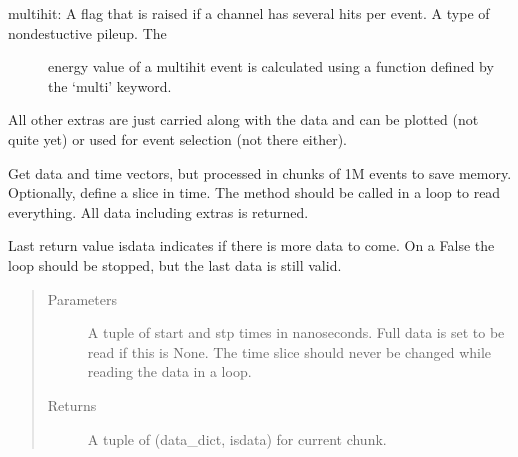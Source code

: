 \documentclass[letterpaper,10pt,english]{sphinxmanual}
\begin{document}
\begin{fulllineitems}
\begin{description}
\item[{multihit: A flag that is raised if a channel has several hits per event. A type of nondestuctive pileup. The}] \leavevmode
\sphinxAtStartPar
energy value of a multihit event is calculated using a function defined by the ‘multi’ keyword.

\end{description}

\sphinxAtStartPar
All other extras are just carried along with the data and can be plotted (not quite yet) or used for event
selection (not there either).

\begin{fulllineitems}
\label{\detokenize{autodocs/data:listmode.data.Data.get_data_block}}
\sphinxAtStartPar
Get data and time vectors, but processed in chunks of 1M events to save memory. Optionally, define a slice in
time. The method should be called in a loop to read everything. All data including extras is returned.

\sphinxAtStartPar
Last return value isdata indicates if there is more data to come. On a False the loop should be stopped, but
the last data is still valid.
\begin{quote}\begin{description}
\item[{Parameters}] \leavevmode
\sphinxAtStartPar
{} \textendash{} A tuple of start and stp times in nanoseconds. Full data is set to be read if this is None. The
time slice should never be changed while reading the data in a loop.

\item[{Returns}] \leavevmode
\sphinxAtStartPar
A tuple of (data\_dict, isdata) for current chunk.

\end{description}\end{quote}

\end{fulllineitems}



\end{fulllineitems}
\end{document}
